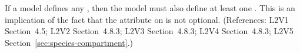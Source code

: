 If a model defines any \Species, then the model must also define at least
one \Compartment.  This is an implication of the fact that the
 attribute on \Species is not optional.  (References: L2V1
Section~4.5; L2V2 Section~4.8.3; L2V3 Section~4.8.3; L2V4 Section~4.8.3; L2V5 Section~\ref{sec:species-compartment}.)
